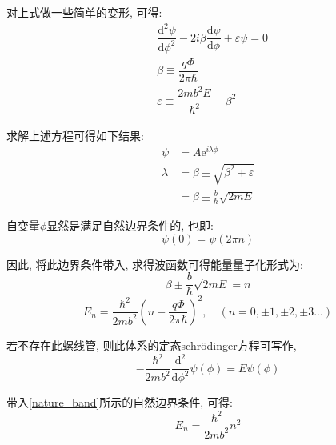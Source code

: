\documentclass[a4paper, 11pt]{article}
\begin{document}
\begin{spacing}{1.2}
        对上式做一些简单的变形, 可得:
        \begin{equation}
          \begin{aligned}
            &\dfrac{\mathrm{d}^2\psi}{\mathrm{d}\phi^2} - 2i\beta\dfrac{\mathrm{d}\psi}{\mathrm{d}\phi}%
            +\varepsilon{}\psi = 0\\
            &\beta\equiv\dfrac{q\Phi}{2\pi\hbar}\\
            &\varepsilon\equiv\dfrac{2mb^2E}{\hbar^2}-\beta^2
          \end{aligned}
        \end{equation}

        求解上述方程可得如下结果:
        \begin{equation}
          \begin{aligned}
            \psi &= A\mathrm{e}^{i\lambda\phi}\\
            \lambda &= \beta\pm\sqrt{\beta^2+\varepsilon}\\
            &= \beta\pm\frac{b}{\hbar}\sqrt{2mE}
          \end{aligned}
        \end{equation}

        自变量$\phi$显然是满足自然边界条件的, 也即:
        \begin{equation}
          \label{nature_band}
          \psi(0) = \psi(2\pi{}n)
        \end{equation}

        因此, 将此边界条件带入, 求得波函数可得能量量子化形式为:
        \begin{equation}
          \beta\pm\frac{b}{\hbar}\sqrt{2mE} = n
        \end{equation}
        \begin{equation}
          E_n = \dfrac{\hbar^2}{2mb^2}\left(n-\frac{q\Phi}{2\pi\hbar}\right)^2, %
          \quad (n = 0,\pm1,\pm2,\pm3...)
        \end{equation}

        若不存在此螺线管, 则此体系的定态schr\"odinger方程可写作, 
        \begin{equation}
          -\dfrac{\hbar^2}{2mb^2}\dfrac{\mathrm{d}^2}{\mathrm{d}\phi^2}\psi(\phi) = E\psi(\phi)
        \end{equation}

        带入\eqref{nature_band}所示的自然边界条件, 可得:
        \begin{equation}
          E_n = \dfrac{\hbar^2}{2mb^2}n^2
        \end{equation}


\end{spacing}
\end{document}
